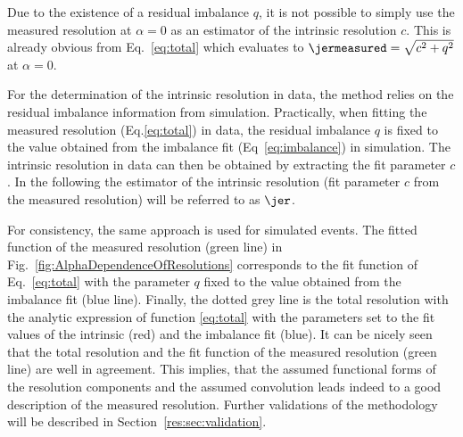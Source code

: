 Due to the existence of a residual imbalance $q$, it is not possible to simply use the measured resolution at $\alpha=0$ as an estimator of the intrinsic resolution $c$.
This is already obvious from Eq.~\eqref{eq:total} which evaluates to $\jermeasured  = \sqrt{c^2 + q^2}$ at $\alpha=0$.

For the determination of the intrinsic resolution in data, the method relies on the residual imbalance information from simulation.
Practically, when fitting the measured resolution (Eq.\eqref{eq:total}) in data, the residual imbalance $q$ is fixed to the value obtained from the imbalance fit (Eq~\ref{eq:imbalance}) in simulation.
The intrinsic resolution in data can then be obtained by extracting the fit parameter $c$.
In the following the estimator of the intrinsic resolution (fit parameter $c$ from the measured resolution) will be referred to as $\jer$.

For consistency, the same approach is used for simulated events.
The fitted function of the measured resolution (green line) in Fig.~\ref{fig:AlphaDependenceOfResolutions} corresponds to the fit function of Eq.~\eqref{eq:total} with the parameter $q$ fixed to the value obtained from the imbalance fit (blue line).
Finally, the dotted grey line is the total resolution with the analytic expression of function \eqref{eq:total} with the parameters set to the fit values of the intrinsic (red) and the imbalance fit (blue). 
It can be nicely seen that the total resolution and the fit function of the measured resolution (green line) are well in agreement.
This implies, that the assumed functional forms of the resolution components and the assumed convolution leads indeed to a good description of the measured resolution.
Further validations of the methodology will be described in Section~\ref{res:sec:validation}.


